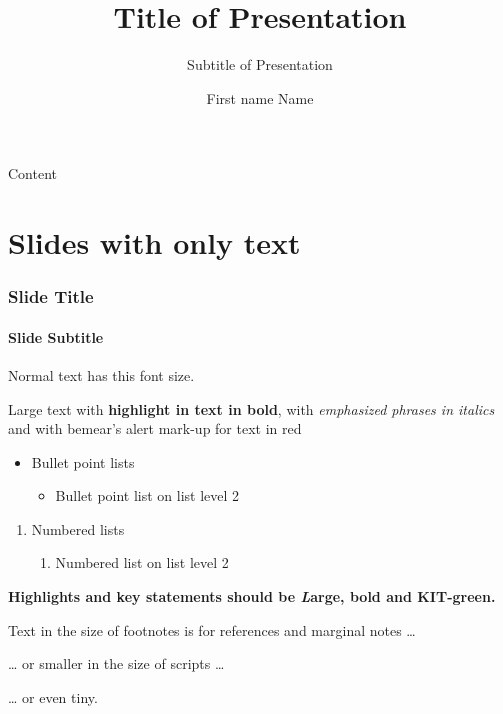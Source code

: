 \documentclass[
 UKenglish%
 ]{beamer}%
\author[F.\,N. Name]{First name Name}
\title[Short title]{Title of Presentation}
\subtitle{Subtitle of Presentation}
\institute[Name of Division, Institute, Business Unit]{Name of Division, Institute, Business Unit}
\begin{document}
\frame[empty]{\titlepage}


\frame[KITgreen]{\titlepage}

\frame[KITgreenhalf]{\titlepage}

\frame[KITgreenhalfdarkblue]{\titlepage}

%
\frame[KITgreenbottom]{\titlepage}


\begin{frame}[KITgreenTOC,t]{\fontsize{10}{10}\selectfont\textcolor{KITwhite}{Content}\hfill{}\hbox{\scalebox{0.72}{\KITlogo}}\kern3mm}
  \vspace*{-5mm}%
  \tableofcontents
\end{frame}

\section{Slides with only text}

\begin{frame}[c]%
  \frametitle{Slide Title}
  \framesubtitle{Slide Subtitle}

  Normal text has this font size.

  {\large Large text with \textbf{highlight in text in bold}, with \emph{emphasized phrases in italics} and with \alert{bemear's alert mark-up for text in red}\par}
  
  \begin{itemize}
  \item Bullet point lists
    \begin{itemize}
    \item Bullet point list on list level 2
    \end{itemize}
  \end{itemize}
  \begin{enumerate}
  \item Numbered lists
    \begin{enumerate}
    \item Numbered list on list level 2
    \end{enumerate}
  \end{enumerate}

  {\Large\bfseries\color{KITgreen}Highlights and key statements should be \emph{L}arge, bold and KIT-green.\par}

  {\footnotesize Text in the size of footnotes is for references and marginal notes \dots{}\par}

  {\scriptsize \dots{} or smaller in the size of scripts \dots{}\par}

  {\tiny \dots{} or even tiny.\par}
\end{frame}
\end{document}
